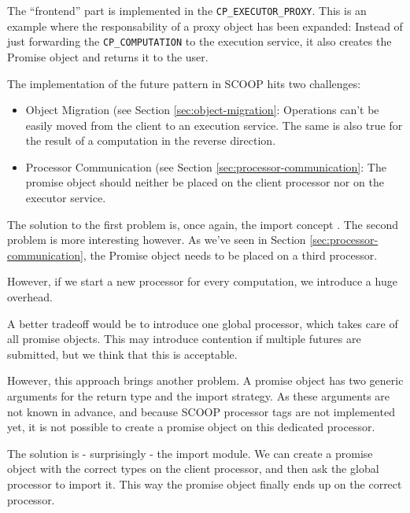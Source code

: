 \documentclass[a4paper,10pt]{article}
\newcommand{\todoref}{\todo{ref}}
\begin{document}
The ``frontend'' part is implemented in the \lstinline!CP_EXECUTOR_PROXY!.
This is an example where the responsability of a proxy object has been expanded:
Instead of just forwarding the \lstinline!CP_COMPUTATION! to the execution service, it also creates the Promise object and returns it to the user.

The implementation of the future pattern in SCOOP hits two challenges:
\begin{itemize}
 \item Object Migration (see Section \ref{sec:object-migration}: Operations can't be easily moved from the client to an execution service.
 The same is also true for the result of a computation in the reverse direction.
 \item Processor Communication (see Section \ref{sec:processor-communication}: The promise object should neither be placed on the client processor nor on the executor service.
\end{itemize}

The solution to the first problem is, once again, the import concept \todoref.
The second problem is more interesting however.
As we've seen in Section \ref{sec:processor-communication}, the Promise object needs to be placed on a third processor.

However, if we start a new processor for every computation, we introduce a huge overhead.

A better tradeoff would be to introduce one global processor, which takes care of all promise objects.
This may introduce contention if multiple futures are submitted, but we think that this is acceptable.

However, this approach brings another problem.
A promise object has two generic arguments for the return type and the import strategy.
As these arguments are not known in advance, and because SCOOP processor tags  are not implemented yet, it is not possible to create a promise object on this dedicated processor.

The solution is - surprisingly - the import module.
We can create a promise object with the correct types on the client processor, and then ask the global processor to import it.
This way the promise object finally ends up on the correct processor.
\end{document}
